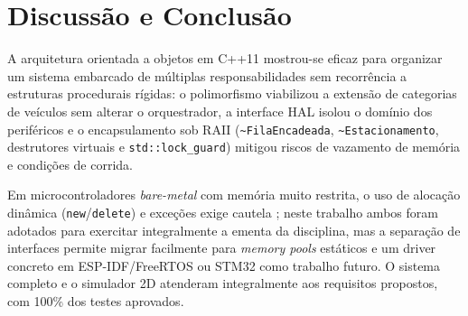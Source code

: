 \documentclass[10pt,twocolumn,a4paper]{article}
\newcommand{\code}[1]{\texttt{\footnotesize #1}}
\begin{document}
\section{Discussão e Conclusão}

A arquitetura orientada a objetos em C++11 mostrou-se eficaz para organizar um sistema embarcado de múltiplas responsabilidades sem recorrência a estruturas procedurais rígidas: o polimorfismo viabilizou a extensão de categorias de veículos sem alterar o orquestrador, a interface HAL isolou o domínio dos periféricos e o encapsulamento sob RAII (\code{\textasciitilde FilaEncadeada}, \code{\textasciitilde Estacionamento}, destrutores virtuais e \code{std::lock\_guard}) mitigou riscos de vazamento de memória e condições de corrida.

Em microcontroladores \textit{bare-metal} com memória muito restrita, o uso de alocação dinâmica (\code{new}/\code{delete}) e exceções exige cautela \cite{maimone2014mars}; neste trabalho ambos foram adotados para exercitar integralmente a ementa da disciplina, mas a separação de interfaces permite migrar facilmente para \textit{memory pools} estáticos e um driver concreto em ESP-IDF/FreeRTOS ou STM32 como trabalho futuro. O sistema completo e o simulador 2D atenderam integralmente aos requisitos propostos, com 100\% dos testes aprovados.



\end{document}

